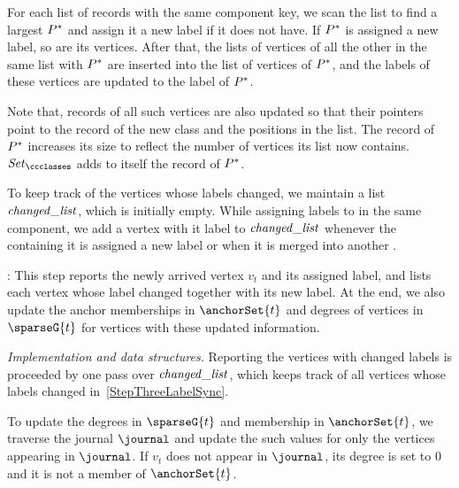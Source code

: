 For each list of records with the same component key, we scan the list to find a largest \piece{} $ P^* $ and assign it a new label if it does not have.
If $ P^* $ is assigned a new label, so are its vertices.
After that, the lists of vertices of all the other  in the same list with $ P^* $ are inserted into the list of vertices of $ P^* $, and the labels of these vertices are updated to the label of $ P^* $.

Note that, records of all such vertices are also updated so that their pointers point to the record of the new class and the positions in the list.
The record of $ P^{*} $ increases its size to reflect the number of vertices its list now contains.
$ \setClasses $ adds to itself the record of $ P^* $.

To keep track of the vertices whose labels changed, we maintain a list $ \mathit{changed\_list} $, which is initially empty.
While assigning labels to  in the same component, we add a vertex with it label to $ \mathit{changed\_list} $ whenever the \piece{} containing it is assigned a new label or when it is merged into another \piece{}.

\noindent{}:
This step reports the newly arrived vertex $ v_{t} $ and its assigned label, and lists each vertex whose label changed together with its new label.
At the end, we also update the anchor memberships in $ \anchorSet{t} $ and degrees of vertices in $ \sparseG{t} $ for vertices with these updated information.

\textit{Implementation and data structures.}
Reporting the vertices with changed labels is proceeded by one pass over $ \mathit{changed\_list} $, which keeps track of all vertices whose labels changed in~\ref{StepThreeLabelSync}.

To update the degrees in $ \sparseG{t} $ and membership in $ \anchorSet{t} $, we traverse the journal $ \journal $ and update the such values for only the vertices appearing in $ \journal $.
If $ v_t $ does not appear in $ \journal $, its degree is set to $ 0 $ and it is not a member of $ \anchorSet{t} $.


